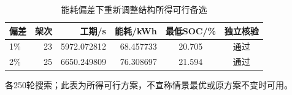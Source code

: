 \begin{table}[htbp]\centering\small
\caption{能耗偏差下重新调整结构所得可行备选}\label{tab:q2_energy_alternatives}
\begin{tabular}{@{}lrrrcc@{}}
\toprule
偏差 & 架次 & 工期/s & 能耗/kWh & 最低SOC/\% & 独立核验\\
\midrule
1\% & 23 & 5972.072812 & 68.457733 & 20.705 & 通过\\
2\% & 25 & 6650.249809 & 76.308697 & 21.594 & 通过\\
\bottomrule
\end{tabular}
\par\smallskip\parbox{.96\linewidth}{\footnotesize 各250轮搜索；此表为所得可行方案，不宣称情景最优或原方案不变时可用。}
\end{table}
